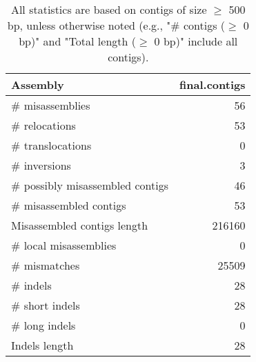\documentclass[12pt,a4paper]{article}
\begin{document}
\begin{table}[ht]
\begin{center}
\caption{All statistics are based on contigs of size $\geq$ 500 bp, unless otherwise noted (e.g., "\# contigs ($\geq$ 0 bp)" and "Total length ($\geq$ 0 bp)" include all contigs).}
\begin{tabular}{|l*{1}{|r}|}
\hline
Assembly & final.contigs \\ \hline
\# misassemblies & 56 \\ \hline
\hspace{5mm}\# relocations & 53 \\ \hline
\hspace{5mm}\# translocations & 0 \\ \hline
\hspace{5mm}\# inversions & 3 \\ \hline
\# possibly misassembled contigs & 46 \\ \hline
\# misassembled contigs & 53 \\ \hline
Misassembled contigs length & 216160 \\ \hline
\# local misassemblies & 0 \\ \hline
\# mismatches & 25509 \\ \hline
\# indels & 28 \\ \hline
\hspace{5mm}\# short indels & 28 \\ \hline
\hspace{5mm}\# long indels & 0 \\ \hline
Indels length & 28 \\ \hline
\end{tabular}
\end{center}
\end{table}
\end{document}
